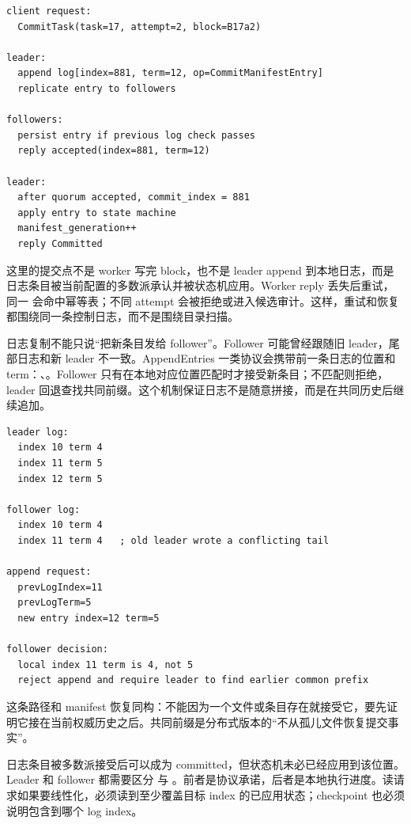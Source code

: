 \begin{lstlisting}[numbers=none,caption={manifest commit 进入控制日志的事件链}]
client request:
  CommitTask(task=17, attempt=2, block=B17a2)

leader:
  append log[index=881, term=12, op=CommitManifestEntry]
  replicate entry to followers

followers:
  persist entry if previous log check passes
  reply accepted(index=881, term=12)

leader:
  after quorum accepted, commit_index = 881
  apply entry to state machine
  manifest_generation++
  reply Committed
\end{lstlisting}

这里的提交点不是 worker 写完 block，也不是 leader append 到本地日志，而是日志条目被当前配置的多数派承认并被状态机应用。Worker reply 丢失后重试，同一  会命中幂等表；不同 attempt 会被拒绝或进入候选审计。这样，重试和恢复都围绕同一条控制日志，而不是围绕目录扫描。

日志复制不能只说“把新条目发给 follower”。Follower 可能曾经跟随旧 leader，尾部日志和新 leader 不一致。AppendEntries 一类协议会携带前一条日志的位置和 term：、。Follower 只有在本地对应位置匹配时才接受新条目；不匹配则拒绝，leader 回退查找共同前缀。这个机制保证日志不是随意拼接，而是在共同历史后继续追加。

\begin{lstlisting}[numbers=none,caption={日志尾部分叉时的拒绝路径}]
leader log:
  index 10 term 4
  index 11 term 5
  index 12 term 5

follower log:
  index 10 term 4
  index 11 term 4   ; old leader wrote a conflicting tail

append request:
  prevLogIndex=11
  prevLogTerm=5
  new entry index=12 term=5

follower decision:
  local index 11 term is 4, not 5
  reject append and require leader to find earlier common prefix
\end{lstlisting}

这条路径和 manifest 恢复同构：不能因为一个文件或条目存在就接受它，要先证明它接在当前权威历史之后。共同前缀是分布式版本的“不从孤儿文件恢复提交事实”。

日志条目被多数派接受后可以成为 committed，但状态机未必已经应用到该位置。Leader 和 follower 都需要区分  与 。前者是协议承诺，后者是本地执行进度。读请求如果要线性化，必须读到至少覆盖目标 index 的已应用状态；checkpoint 也必须说明包含到哪个 log index。


